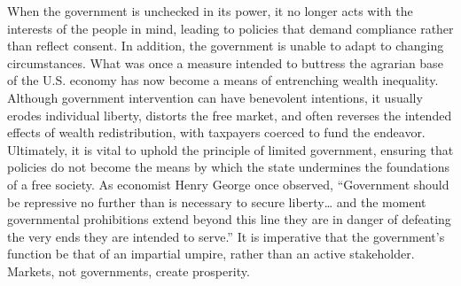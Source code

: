 When the government is unchecked in its power, it no longer acts with the interests of the people in mind, leading to policies that demand compliance rather than reflect consent. In addition, the government is unable to adapt to changing circumstances. What was once a measure intended to buttress the agrarian base of the U.S. economy has now become a means of entrenching wealth inequality. Although government intervention can have benevolent intentions, it usually erodes individual liberty, distorts the free market, and often reverses the intended effects of wealth redistribution, with taxpayers coerced to fund the endeavor. Ultimately, it is vital to uphold the principle of limited government, ensuring that policies do not become the means by which the state undermines the foundations of a free society. As economist Henry George once observed, “Government should be repressive no further than is necessary to secure liberty… and the moment governmental prohibitions extend beyond this line they are in danger of defeating the very ends they are intended to serve.” It is imperative that the government’s function be that of an impartial umpire, rather than an active stakeholder. Markets, not governments, create prosperity. 

